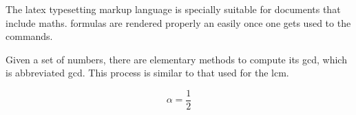 \documentclass[../../../main.tex]{subfiles}
\begin{document}
The \Gls{latex} typesetting markup language is specially suitable 
for documents that include \gls{maths}. \Glspl{formula} are 
rendered properly an easily once one gets used to the commands.

Given a set of numbers, there are elementary methods to compute 
its \acrlong{gcd}, which is abbreviated \acrshort{gcd}. This 
process is similar to that used for the \acrfull{lcm}.

\begin{equation}
    \alpha = \frac{1}{2}
\end{equation}

\lipsum[1]
\end{document}
